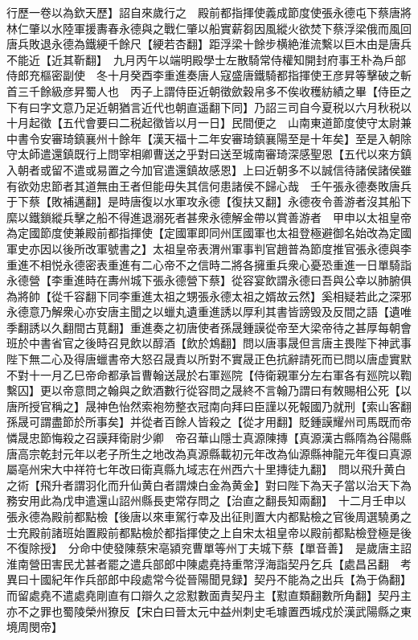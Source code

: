 行歷一卷以為欽天歷】詔自來歲行之　殿前都指揮使義成節度使張永德屯下蔡唐將林仁肇以水陸軍援夀春永德與之戰仁肇以船實薪芻因風縱火欲焚下蔡浮梁俄而風回唐兵敗退永德為鐵綆千餘尺【綆若杏翻】距浮梁十餘步横絶淮流繫以巨木由是唐兵不能近【近其靳翻】　九月丙午以端明殿學士左散騎常侍權知開封府事王朴為戶部侍郎充樞密副使　冬十月癸酉李重進奏唐人寇盛唐鐵騎都指揮使王彦昇等擊破之斬首三千餘級彦昇蜀人也　丙子上謂侍臣近朝徵歛穀帛多不俟收穫紡績之畢【侍臣之下有曰字文意乃足近朝猶言近代也朝直遥翻下同】乃詔三司自今夏税以六月秋税以十月起徵【五代會要曰二税起徵皆以月一日】民間便之　山南東道節度使守太尉兼中書令安審琦鎮襄州十餘年【漢天福十二年安審琦鎮襄陽至是十年矣】至是入朝除守太師遣還鎮既行上問宰相卿曹送之乎對曰送至城南審琦深感聖恩【五代以來方鎮入朝者或留不遣或易置之今加官遣還鎮故感恩】上曰近朝多不以誠信待諸侯諸侯雖有欲効忠節者其道無由王者但能毋失其信何患諸侯不歸心哉　壬午張永德奏敗唐兵于下蔡【敗補邁翻】是時唐復以水軍攻永德【復扶又翻】永德夜令善游者沒其船下縻以鐵鎖縱兵擊之船不得進退溺死者甚衆永德解金帶以賞善游者　甲申以太祖皇帝為定國節度使兼殿前都指揮使【定國軍即同州匡國軍也太祖登極避御名始改為定國軍史亦因以後所改軍號書之】太祖皇帝表渭州軍事判官趙普為節度推官張永德與李重進不相悦永德密表重進有二心帝不之信時二將各擁重兵衆心憂恐重進一日單騎詣永德營【李重進時在夀州城下張永德營下蔡】從容宴飲謂永德曰吾與公幸以肺腑俱為將帥【從千容翻下同李重進太祖之甥張永德太祖之婿故云然】奚相疑若此之深邪永德意乃解衆心亦安唐主聞之以蠟丸遺重進誘以厚利其書皆謗毁及反間之語【遺唯季翻誘以久翻間古莧翻】重進奏之初唐使者孫晟鍾謨從帝至大梁帝待之甚厚每朝會班於中書省官之後時召見飲以醇酒【飲於鴆翻】問以唐事晟但言唐主畏陛下神武事陛下無二心及得唐蠟書帝大怒召晟責以所對不實晟正色抗辭請死而已問以唐虚實默不對十一月乙巳帝命都承旨曹翰送晟於右軍廵院【侍衛親軍分左右軍各有廵院以鞫繫囚】更以帝意問之翰與之飲酒數行從容問之晟終不言翰乃謂曰有敇賜相公死【以唐所授官稱之】晟神色怡然索袍笏整衣冠南向拜曰臣謹以死報國乃就刑【索山客翻孫晟可謂盡節於所事矣】并從者百餘人皆殺之【從才用翻】貶鍾謨耀州司馬既而帝憐晟忠節悔殺之召謨拜衛尉少卿　帝召華山隱士真源陳摶【真源漢古縣隋為谷陽縣唐高宗乾封元年以老子所生之地改為真源縣載初元年改為仙源縣神龍元年復曰真源屬亳州宋大中祥符七年改曰衛真縣九域志在州西六十里摶徒九翻】　問以飛升黄白之術【飛升者謂羽化而升仙黄白者謂煉白金為黄金】對曰陛下為天子當以治天下為務安用此為戊申遣還山詔州縣長吏常存問之【治直之翻長知兩翻】　十二月壬申以張永德為殿前都點檢【後唐以來車駕行幸及出征則置大内都點檢之官後周選驍勇之士充殿前諸班始置殿前都點檢於都指揮使之上自宋太祖皇帝以殿前都點檢登極是後不復除授】　分命中使發陳蔡宋亳潁兖曹單等州丁夫城下蔡【單音善】　是歲唐主詔淮南營田害民尤甚者罷之遣兵部郎中陳處堯持重幣浮海詣契丹乞兵【處昌呂翻　考異曰十國紀年作兵部郎中段處常今從晉陽聞見録】契丹不能為之出兵【為于偽翻】而留處堯不遣處堯剛直有口辯久之忿懟數面責契丹主【懟直類翻數所角翻】契丹主亦不之罪也蜀陵榮州獠反【宋白曰晉太元中益州刺史毛璩置西城戍於漢武陽縣之東境周閔帝】

